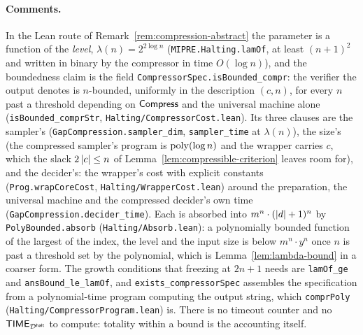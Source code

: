 \paragraph{Comments.} In the Lean route of Remark~\ref{rem:compression-abstract} the parameter
is a function of the \emph{level}, $\lambda(n) = 2^{2 \log n}$
(\texttt{MIPRE.Halting.lamOf}, at least $(n+1)^2$ and written in binary by the compressor in
time $O(\log n)$), and the boundedness claim is the field
\texttt{CompressorSpec.isBounded\_compr}: the verifier the output denotes is $n$-bounded,
uniformly in the description $(c, n)$, for every $n$ past a threshold depending on
$\mathsf{Compress}$ and the universal machine alone (\texttt{isBounded\_comprStr},
\texttt{Halting/CompressorCost.lean}). Its three clauses are the sampler's
(\texttt{GapCompression.sampler\_dim}, \texttt{sampler\_time} at $\lambda(n)$), the size's
(the compressed sampler's program is $\mathrm{poly}(\log n)$ and the wrapper carries $c$, which the
slack $2\left\vert {c} \right\vert \leq n$ of Lemma~\ref{lem:compressible-criterion} leaves room for), and the
decider's: the wrapper's cost with explicit constants (\texttt{Prog.wrapCoreCost},
\texttt{Halting/WrapperCost.lean}) around the preparation, the universal machine and the
compressed decider's own time (\texttt{GapCompression.decider\_time}). Each is absorbed into
$m^n \cdot (\left\vert {d} \right\vert+1)^n$ by \texttt{PolyBounded.absorb} (\texttt{Halting/Absorb.lean}): a
polynomially bounded function of the largest of the index, the level and the input size is
below $m^n \cdot y^n$ once $n$ is past a threshold set by the polynomial, which is
Lemma~\ref{lem:lambda-bound} in a coarser form. The growth conditions that freezing at
$2n + 1$ needs are \texttt{lamOf\_ge} and \texttt{ansBound\_le\_lamOf}, and
\texttt{exists\_compressorSpec} assembles the specification from a polynomial-time program
computing the output string, which \texttt{comprPoly}
(\texttt{Halting/CompressorProgram.lean}) is. There is no timeout counter and no
$\mathsf{TIME}_{\mathcal{D}^{\mathsf{halt}}}$ to compute: totality within a bound is the accounting itself.

